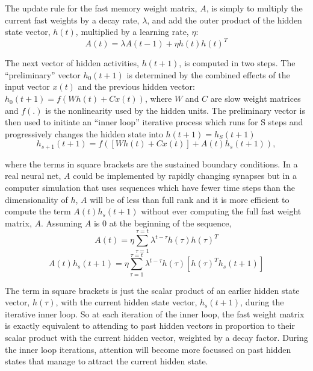 \documentclass{article}
\begin{document}
The update rule for the fast memory weight matrix, $A$, is simply to multiply the current fast weights by a decay rate, $\lambda$, and add the outer product of the hidden state vector, $h(t)$, multiplied by a learning rate, $\eta$: 
\begin{equation}
A(t) = \lambda A(t-1) + \eta h(t) h(t)^T 
\end{equation}

The next vector of hidden activities, $h(t+1)$, is computed in two steps.  The ``preliminary'' vector $h_0(t+1)$ is determined by the combined effects of the input vector $x(t)$ and the previous hidden vector:  $h_0(t+1) = f(W h(t) + C x(t)) $, where $W$ and $C$ are slow weight matrices and $f(.)$ is the nonlinearity used by the hidden units. The preliminary vector is then used to initiate an ``inner loop''  iterative process which runs for S steps and progressively changes the hidden state into $h(t+1) = h_S(t+1)$
\begin{equation}
  h_{s+1}(t+1) =  f([W h(t) + C x(t)] + A(t) h_s(t+1)),
\end{equation}

where the terms in square brackets are the sustained boundary conditions. In a real neural net, $A$ could be implemented by rapidly changing synapses
but in a computer simulation that uses sequences which have fewer time steps than the dimensionality of $h$, $A$ will be of less than full rank and it is more efficient to compute the term $A(t) h_s(t+1)$ without ever computing the full fast weight matrix, $A$. Assuming $A$ is $0$ at the beginning of the sequence, 
\begin{equation}
A(t) = \eta \sum_{\tau = 1}^{\tau = t} \lambda^{t-\tau}h(\tau)h(\tau)^T
\end{equation}
\begin{equation}
  A(t) h_{s}(t+1)  =  \eta \sum_{\tau = 1}^{\tau = t} \lambda^{t-\tau} h(\tau) [h(\tau)^T h_{s}(t+1)]\label{eq:fw_lr}
\end{equation}

The term in square brackets is just the scalar product of an earlier hidden state vector, $h(\tau)$, with the current hidden state vector,  $h_{s}(t+1)$, during the iterative inner loop. So at each iteration of the inner loop, the fast weight matrix is exactly equivalent to attending to past hidden vectors in proportion to their scalar product with the current hidden vector, weighted by a decay factor. During the inner loop iterations, attention will become more focussed on past hidden states that manage to attract the current hidden state. 
\end{document}
